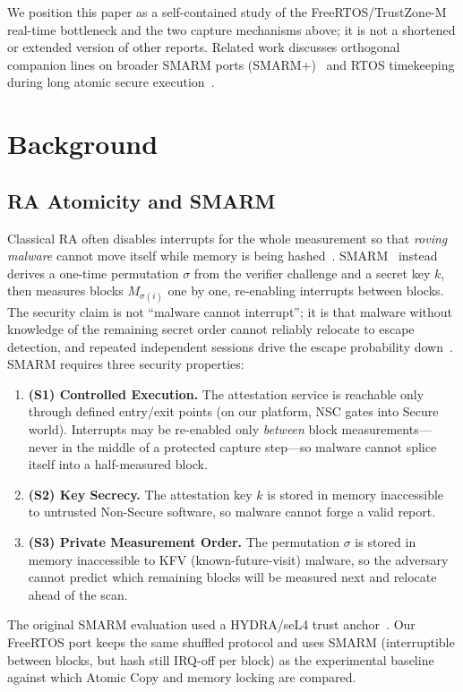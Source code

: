 \documentclass[conference]{IEEEtran}
\begin{document}
We position this paper as a self-contained study of the FreeRTOS/TrustZone-M
real-time bottleneck and the two capture mechanisms above; it is not a
shortened or extended version of other reports.
Related work discusses orthogonal companion lines on broader SMARM ports
(SMARM+)~\cite{smarmplus2026} and RTOS timekeeping during long atomic
secure execution~\cite{joianeto2026timekeeping}.

\section{Background}
\label{sec:background}

\subsection{RA Atomicity and SMARM}

Classical RA often disables interrupts for the whole measurement so that
\emph{roving malware} cannot move itself while memory is being
hashed~\cite{eldefrawy2012smart,nunes2019vrased}.
SMARM~\cite{carpent2018smarm} instead derives a one-time permutation
$\sigma$ from the verifier challenge and a secret key $k$, then measures
blocks $M_{\sigma(i)}$ one by one, re-enabling interrupts between
blocks. The security claim is not ``malware cannot interrupt''; it is
that malware without knowledge of the remaining secret order cannot
reliably relocate to escape detection, and repeated independent sessions
drive the escape probability down~\cite{carpent2018smarm}.
SMARM requires three security properties:
\begin{enumerate}
  \item \textbf{(S1) Controlled Execution.}
    The attestation service is reachable only through defined
    entry/exit points (on our platform, NSC gates into Secure
    world). Interrupts may be re-enabled only
    \emph{between} block measurements---never in the middle of a
    protected capture step---so malware cannot splice itself into a
    half-measured block.
  \item \textbf{(S2) Key Secrecy.}
    The attestation key $k$ is stored in memory inaccessible to
    untrusted Non-Secure software, so malware cannot forge a valid
    report.
  \item \textbf{(S3) Private Measurement Order.}
    The permutation $\sigma$ is stored in memory inaccessible to
    KFV (known-future-visit) malware, so the adversary cannot
    predict which remaining blocks will be measured next and relocate
    ahead of the scan.
\end{enumerate}
The original SMARM evaluation used a HYDRA/seL4 trust
anchor~\cite{eldefrawy2017hydra,carpent2018smarm}. Our FreeRTOS port
keeps the same shuffled protocol and uses SMARM (interruptible between
blocks, but hash still IRQ-off per block) as the experimental baseline
against which Atomic Copy and memory locking are compared.
\end{document}
